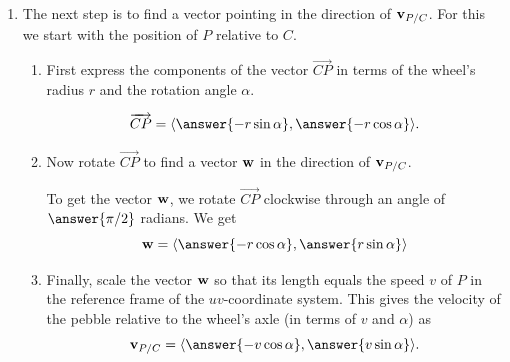 \documentclass{ximera}
\begin{document}
\begin{question}
\begin{enumerate}
\begin{enumerate}
Explain why these two distances are both equal to the distance $OQ$.

\begin{freeResponse}
\end{freeResponse}

\item The next step is to find a vector pointing in the direction of ${\bf v}_{P/C}$. For this we start with the position of $P$ relative to $C$. 
 
\begin{enumerate}
\item First express the components of the vector $\overrightarrow{CP}$ in terms of the wheel's radius $r$ and the rotation angle $\alpha$.

\[
    \overrightarrow{CP} = \langle \answer{- r\sin\alpha},  \answer{-r\cos \alpha}  \rangle . 
\]

\item Now rotate $\overrightarrow{CP}$ to find a vector ${\bf w}$ in the direction of ${\bf v}_{P/C}$. 

To get the vector ${\bf w}$, we rotate $\overrightarrow{CP}$ clockwise through an angle of $\answer{\pi/2}$ radians. We get
\[
     {\bf w} = \langle  \answer{-r\cos \alpha}, \answer{r\sin\alpha} \rangle        
\]

\item Finally, scale the vector ${\bf w}$ so that its length equals the speed $v$ of $P$ in the reference frame of the $uv$-coordinate system. This gives the velocity of the pebble relative to the wheel's axle (in terms of $v$ and $\alpha$) as
\[
  {\bf v}_{P/C} = \langle  \answer{-v\cos \alpha}, \answer{v\sin\alpha}  \rangle .
\]

\end{enumerate}

\end{enumerate}






\end{enumerate}
\end{question}
\end{document}
